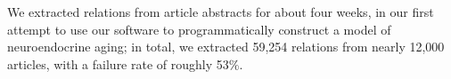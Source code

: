 We extracted relations from article abstracts for about four weeks, in our first attempt to use our software to programmatically construct
a model of neuroendocrine aging; in total, we extracted 59,254 relations from nearly 12,000 articles, with a failure rate of roughly 53\%.
